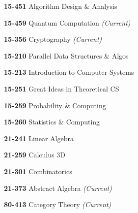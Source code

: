 \begin{cventries}
{\begin{cvitems}
\begin{multicols}{3}
          \item[] {\textbf{15-451} Algorithm Design \& Analysis}
          \item[] {\textbf{15-459} Quantum Computation
            \textit{\color{awesome}(Current)}}
          \item[] {\textbf{15-356} Cryptography
            \textit{\color{awesome}(Current)}}
          \item[] {\textbf{15-210} Parallel Data Structures \& Algos}
          \item[] {\textbf{15-213} Introduction to Computer Systems}
          \item[] {\textbf{15-251} Great Ideas in Theoretical CS}
          \item[] {\textbf{15-259} Probability \& Computing}
          \item[] {\textbf{15-260} Statistics \& Computing}
          \item[] {\textbf{21-241} Linear Algebra}
          \item[] {\textbf{21-259} Calculus 3D}
          \item[] {\textbf{21-301} Combinatorics}
          \item[] {\textbf{21-373} Abstract Algebra \textit{\color{awesome}(Current)}}
          \item[] {\textbf{80-413} Category Theory \textit{\color{awesome}(Current)}}
        \end{multicols}
      \end{cvitems}
    }
\end{cventries}
